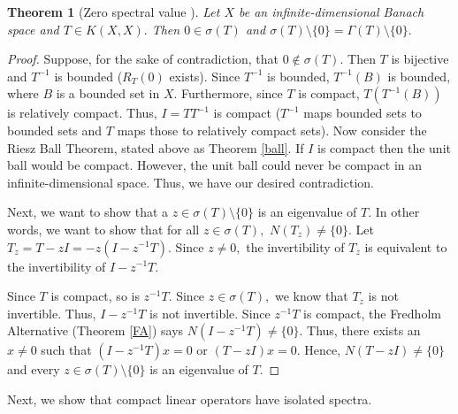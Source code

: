 \documentclass[12pt,a4paper]{article}
\theoremstyle{boldthm}
\newtheorem{theorem}{Theorem}[section]
\theoremstyle{bolddefn}
\begin{document}
\begin{theorem}[Zero spectral value \cite{umberto}] \label{zero z}
    Let $X$ be an infinite-dimensional Banach space and $T \in K(X, X).$ Then $0 \in \sigma(T)$ and $\sigma(T)\setminus \{0\} = \Gamma(T)\setminus \{0\}.$
\end{theorem}
\begin{proof}
    Suppose, for the sake of contradiction, that $0 \notin \sigma(T).$ Then $T$ is bijective and $T^{-1}$ is bounded ($R_T(0)$ exists). 
    Since $T^{-1}$ is bounded, $T^{-1}(B)$ is bounded, where $B$ is a bounded set in $X.$ Furthermore, since $T$ is compact, $T(T^{-1}(B))$ is relatively compact. Thus,  $I = TT^{-1}$ is compact ($T^{-1}$ maps bounded sets to bounded sets and $T$ maps those to relatively compact sets).  
    Now consider the Riesz Ball Theorem, stated above as Theorem \ref{ball}. If $I$ is compact then the unit ball would be compact. However, the unit ball could never be compact in an infinite-dimensional space. Thus, we have our desired contradiction.

    Next, we want to show that a $z \in \sigma(T) \setminus \{0\}$ is an eigenvalue of $T.$ In other words, we want to show that for all $z \in \sigma(T), $ $N(T_z) \ne \{0\}.$ Let $T_z = T-zI = -z(I - z^{-1}T).$ Since $z\ne 0,$ the invertibility of $T_z$ is equivalent to the invertibility of $I - z^{-1} T.$ 

    Since $T$ is compact, so is $z^{-1}T.$ Since $z \in \sigma(T),$ we know that $T_z$ is not invertible. Thus, $I - z^{-1}T$ is not invertible. Since $z^{-1}T$ is compact, the Fredholm Alternative (Theorem \ref{FA}) says $N(I-z^{-1}T) \ne \{0\}.$ Thus, there exists an $x \ne 0$ such that $(I - z^{-1}T)x=0$ or $(T-zI)x = 0.$ Hence, $N(T-zI) \ne \{0\}$ and every $z \in \sigma(T)\setminus \{0\}$ is an eigenvalue of $T.$ 
\end{proof}

Next, we show that compact linear operators have isolated spectra.
\end{document}
